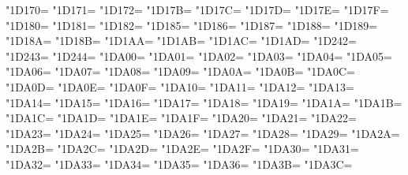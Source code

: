 \XeTeXcharclass"1D170=\KclassCM
\XeTeXcharclass"1D171=\KclassCM
\XeTeXcharclass"1D172=\KclassCM
\XeTeXcharclass"1D17B=\KclassCM
\XeTeXcharclass"1D17C=\KclassCM
\XeTeXcharclass"1D17D=\KclassCM
\XeTeXcharclass"1D17E=\KclassCM
\XeTeXcharclass"1D17F=\KclassCM
\XeTeXcharclass"1D180=\KclassCM
\XeTeXcharclass"1D181=\KclassCM
\XeTeXcharclass"1D182=\KclassCM
\XeTeXcharclass"1D185=\KclassCM
\XeTeXcharclass"1D186=\KclassCM
\XeTeXcharclass"1D187=\KclassCM
\XeTeXcharclass"1D188=\KclassCM
\XeTeXcharclass"1D189=\KclassCM
\XeTeXcharclass"1D18A=\KclassCM
\XeTeXcharclass"1D18B=\KclassCM
\XeTeXcharclass"1D1AA=\KclassCM
\XeTeXcharclass"1D1AB=\KclassCM
\XeTeXcharclass"1D1AC=\KclassCM
\XeTeXcharclass"1D1AD=\KclassCM
\XeTeXcharclass"1D242=\KclassCM
\XeTeXcharclass"1D243=\KclassCM
\XeTeXcharclass"1D244=\KclassCM
\XeTeXcharclass"1DA00=\KclassCM
\XeTeXcharclass"1DA01=\KclassCM
\XeTeXcharclass"1DA02=\KclassCM
\XeTeXcharclass"1DA03=\KclassCM
\XeTeXcharclass"1DA04=\KclassCM
\XeTeXcharclass"1DA05=\KclassCM
\XeTeXcharclass"1DA06=\KclassCM
\XeTeXcharclass"1DA07=\KclassCM
\XeTeXcharclass"1DA08=\KclassCM
\XeTeXcharclass"1DA09=\KclassCM
\XeTeXcharclass"1DA0A=\KclassCM
\XeTeXcharclass"1DA0B=\KclassCM
\XeTeXcharclass"1DA0C=\KclassCM
\XeTeXcharclass"1DA0D=\KclassCM
\XeTeXcharclass"1DA0E=\KclassCM
\XeTeXcharclass"1DA0F=\KclassCM
\XeTeXcharclass"1DA10=\KclassCM
\XeTeXcharclass"1DA11=\KclassCM
\XeTeXcharclass"1DA12=\KclassCM
\XeTeXcharclass"1DA13=\KclassCM
\XeTeXcharclass"1DA14=\KclassCM
\XeTeXcharclass"1DA15=\KclassCM
\XeTeXcharclass"1DA16=\KclassCM
\XeTeXcharclass"1DA17=\KclassCM
\XeTeXcharclass"1DA18=\KclassCM
\XeTeXcharclass"1DA19=\KclassCM
\XeTeXcharclass"1DA1A=\KclassCM
\XeTeXcharclass"1DA1B=\KclassCM
\XeTeXcharclass"1DA1C=\KclassCM
\XeTeXcharclass"1DA1D=\KclassCM
\XeTeXcharclass"1DA1E=\KclassCM
\XeTeXcharclass"1DA1F=\KclassCM
\XeTeXcharclass"1DA20=\KclassCM
\XeTeXcharclass"1DA21=\KclassCM
\XeTeXcharclass"1DA22=\KclassCM
\XeTeXcharclass"1DA23=\KclassCM
\XeTeXcharclass"1DA24=\KclassCM
\XeTeXcharclass"1DA25=\KclassCM
\XeTeXcharclass"1DA26=\KclassCM
\XeTeXcharclass"1DA27=\KclassCM
\XeTeXcharclass"1DA28=\KclassCM
\XeTeXcharclass"1DA29=\KclassCM
\XeTeXcharclass"1DA2A=\KclassCM
\XeTeXcharclass"1DA2B=\KclassCM
\XeTeXcharclass"1DA2C=\KclassCM
\XeTeXcharclass"1DA2D=\KclassCM
\XeTeXcharclass"1DA2E=\KclassCM
\XeTeXcharclass"1DA2F=\KclassCM
\XeTeXcharclass"1DA30=\KclassCM
\XeTeXcharclass"1DA31=\KclassCM
\XeTeXcharclass"1DA32=\KclassCM
\XeTeXcharclass"1DA33=\KclassCM
\XeTeXcharclass"1DA34=\KclassCM
\XeTeXcharclass"1DA35=\KclassCM
\XeTeXcharclass"1DA36=\KclassCM
\XeTeXcharclass"1DA3B=\KclassCM
\XeTeXcharclass"1DA3C=\KclassCM
